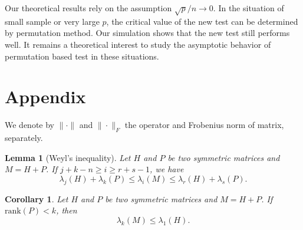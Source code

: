 \documentclass[review]{elsarticle}
\theoremstyle{plain}
\newtheorem{corollary}{\quad\quad Corollary}
\newtheorem{lemma}{\quad\quad Lemma}
\theoremstyle{definition}
\theoremstyle{remark}
\begin{document}

Our theoretical results rely on the assumption $\sqrt{p}/n\to 0$. In the situation of small sample or very large $p$, the critical value of the new test can be determined by permutation method. Our simulation shows that the new test still performs well. It remains a theoretical interest to study the asymptotic behavior of permutation based test in these situations.



\section*{Appendix}
We denote by $\|\cdot \|$ and $\|\cdot\|_F$ the operator and Frobenius  norm of matrix, separately.


\begin{lemma}[Weyl's inequality]
Let $H$ and $P$ be two symmetric matrices and $M=H+P$. If $j+k-n\geq i\geq r+s-1$, we have
\begin{equation*}
\lambda_j(H)+\lambda_k(P)\leq \lambda_i(M) \leq \lambda_r(H)+\lambda_s(P).
\end{equation*}
\end{lemma}
\begin{corollary}\label{WeylCor}
    Let $H$ and $P$ be two symmetric matrices and $M=H+P$. If $\mathrm{rank}(P)< k$, then
    \begin{equation*}
        \lambda_k(M)\leq \lambda_1(H).
    \end{equation*}
\end{corollary}
\end{document}
